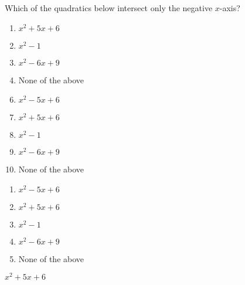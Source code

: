 


  Which of the quadratics below intersect only the negative $x$-axis?


\ifsat
	\begin{enumerate}[label=\Alph*)]
		\item  $x^{2}+5x+6$%
		\item  $x^{2}-1$
		\item  $x^{2}-6x+9$
		\item  None of the above
	\end{enumerate}
\else
\fi

\ifacteven
	\begin{enumerate}[label=\textbf{\Alph*.},itemsep=\fill,align=left]
		\setcounter{enumii}{5}
		\item   $x^{2}-5x+6$
		\item  $x^{2}+5x+6$%
		\item  $x^{2}-1$
		\addtocounter{enumii}{1}
		\item  $x^{2}-6x+9$
		\item  None of the above
	\end{enumerate}
\else
\fi

\ifactodd
	\begin{enumerate}[label=\textbf{\Alph*.},itemsep=\fill,align=left]
		\item   $x^{2}-5x+6$
		\item  $x^{2}+5x+6$%
		\item  $x^{2}-1$
		\item  $x^{2}-6x+9$
		\item  None of the above
	\end{enumerate}
\else
\fi

\ifgridin
  $x^{2}+5x+6$%
		
\else
\fi

